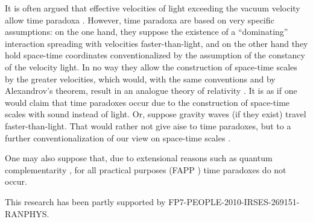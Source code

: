 \documentclass[%
 reprint,
 showpacs,
 showkeys,
 preprintnumbers,
 amsmath,amssymb,
 aps,
 prl,
  longbibliography,
 ]{revtex4-1}
\theoremstyle{definition}
\theoremstyle{remark}
\begin{document}
It is often argued that effective velocities of light exceeding the vacuum velocity
allow time paradoxa \cite{recami:87}.
However, time paradoxa are based on very specific assumptions:
on the one hand, they suppose the existence of a ``dominating'' interaction spreading with velocities faster-than-light,
and
on the other hand they hold space-time coordinates conventionalized by the assumption of the
constancy of the velocity light.
In no way they allow the construction of space-time scales by the greater velocities, which would,
with the same conventions and by Alexandrov's theorem,
result in an analogue theory of relativity \cite{svozil-relrel}.
It is as if one would claim that time paradoxes occur due to the construction of space-time scales
with sound instead of light.
Or, suppose gravity waves (if they exist) travel faster-than-light.
That would rather not give aise to time paradoxes,
but to a further conventionalization of our view on space-time scales \cite{svozil-2001-convention}.

One may also suppose that, due to extensional reasons such as quantum complementarity \cite{milonni},
for all practical purposes (FAPP \cite{bell-a}) time paradoxes do not occur.








\begin{acknowledgments}
 This research has been partly supported by FP7-PEOPLE-2010-IRSES-269151-RANPHYS.
\end{acknowledgments}

 
\end{document}
